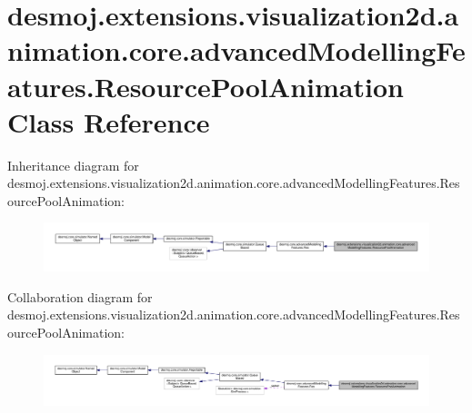 \section{desmoj.\-extensions.\-visualization2d.\-animation.\-core.\-advanced\-Modelling\-Features.\-Resource\-Pool\-Animation Class Reference}
\label{classdesmoj_1_1extensions_1_1visualization2d_1_1animation_1_1core_1_1advanced_modelling_features_1_1_resource_pool_animation}


Inheritance diagram for desmoj.\-extensions.\-visualization2d.\-animation.\-core.\-advanced\-Modelling\-Features.\-Resource\-Pool\-Animation\-:
\nopagebreak
\begin{figure}[H]
\begin{center}
\leavevmode
\includegraphics[width=350pt]{classdesmoj_1_1extensions_1_1visualization2d_1_1animation_1_1core_1_1advanced_modelling_features68a86fd6ad982cdebce6a550a1d4a2fa}
\end{center}
\end{figure}


Collaboration diagram for desmoj.\-extensions.\-visualization2d.\-animation.\-core.\-advanced\-Modelling\-Features.\-Resource\-Pool\-Animation\-:
\nopagebreak
\begin{figure}[H]
\begin{center}
\leavevmode
\includegraphics[width=350pt]{classdesmoj_1_1extensions_1_1visualization2d_1_1animation_1_1core_1_1advanced_modelling_featuresb56386a7cea85997ed87420bdb1033bf}
\end{center}
\end{figure}
